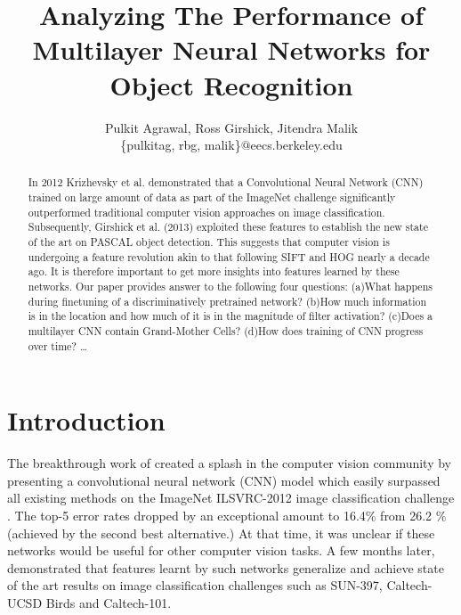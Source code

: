 \documentclass[runningheads]{llncs}
\begin{document}
\pagestyle{headings}
\mainmatter
\title{Analyzing The Performance of Multilayer Neural Networks for Object Recognition} %



\author{Pulkit Agrawal, Ross Girshick, Jitendra Malik \\ \{pulkitag, rbg, malik\}$@$eecs.berkeley.edu}


\maketitle

\begin{abstract}
In 2012 Krizhevsky et al. demonstrated that a Convolutional Neural Network (CNN) trained on large amount of data as part of the ImageNet challenge significantly outperformed traditional computer vision approaches on image classification. Subsequently, Girshick et al. (2013) exploited these features to establish the new state of the art on PASCAL object detection. This suggests that computer vision is undergoing a feature revolution akin to that following SIFT and HOG nearly a decade ago. It is therefore important to get more insights into features learned by these networks. Our paper provides answer to the following four questions: (a)What happens during finetuning of a discriminatively pretrained network? (b)How much information is in the location and how much of it is in the magnitude of filter activation? (c)Does a multilayer CNN contain Grand-Mother Cells? (d)How does training of CNN progress over time?
\dots
{}
\end{abstract}

\section{Introduction}
The breakthrough work of \cite{Kriz} created a splash in the computer vision community by presenting a convolutional neural network (CNN) model which easily surpassed all existing methods on the ImageNet ILSVRC-2012 image classification challenge \cite{imagenet}.  The top-5 error rates dropped by an exceptional amount to 16.4\% from  26.2 \% (achieved by the second best alternative.) At that time, it was unclear if these networks would be useful for other computer vision tasks. A few months later, \cite{Decaf} demonstrated that features learnt by such networks generalize and achieve state of the art results on image classification challenges such as SUN-397\cite{sun}, Caltech-UCSD Birds and Caltech-101. 
\end{document}
